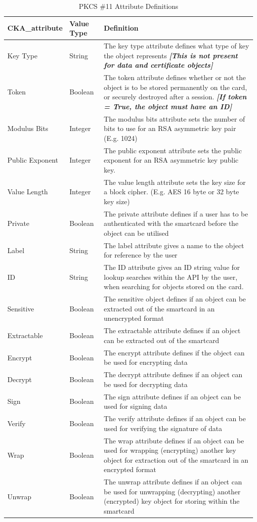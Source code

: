 \documentclass[bsc,frontabs,twoside,singlespacing,parskip,deptreport]{infthesis}     %
\begin{document}
\begin{table}[H]
\begin{tabular}{|l|l|p{10cm}|}
\hline
CKA\_attribute & Value Type & Definition\\
\hline
Key Type & String & The key type attribute defines what type of key the object represents \textbf{\textit{[This is not present for data and certificate objects]}}\\
\hline
Token & Boolean & The token attribute defines whether or not the object is to be stored permanently on the card, or securely destroyed after a session. \textbf{\textit{[If token = True, the object must have an ID]}} \\
\hline

Modulus Bits & Integer & The modulus bits attribute sets the number of bits to use for an RSA asymmetric key pair (E.g. 1024)  \\
\hline
Public Exponent & Integer & The public exponent attribute sets the public exponent for an RSA asymmetric key public key. \\
\hline
Value Length & Integer & The value length attribute sets the key size for a block cipher. (E.g. AES 16 byte or 32 byte key size) \\
\hline

Private & Boolean & The private attribute defines if a user has to be authenticated with the smartcard before the object can be utilised \\
\hline
Label & String & The label attribute gives a name to the object for reference by the user \\
\hline
ID & String & The ID attribute gives an ID string value for lookup searches within the API by the user, when searching for objects stored on the card. \\
\hline
Sensitive & Boolean & The sensitive object defines if an object can be extracted out of the smartcard in an unencrypted format \\
\hline
Extractable & Boolean & The extractable attribute defines if an object can be extracted out of the smartcard\\
\hline
Encrypt & Boolean & The encrypt attribute defines if the object can be used for encrypting data \\
\hline 
Decrypt & Boolean & The decrypt attribute defines if an object can be used for decrypting data \\
\hline
Sign & Boolean & The sign attribute defines if an object can be used for signing data \\
\hline 
Verify & Boolean & The verify attribute defines if an object can be used for verifying the signature of data \\
\hline
Wrap & Boolean & The wrap attribute defines if an object can be used for wrapping (encrypting) another key object for extraction out of the smartcard in an encrypted format \\
\hline
Unwrap & Boolean & The unwrap attribute defines if an object can be used for unwrapping (decrypting) another (encrypted) key object for storing within the smartcard \\
\hline
\end{tabular}
\caption{PKCS \#11 Attribute Definitions}
\end{table}
\end{document}
